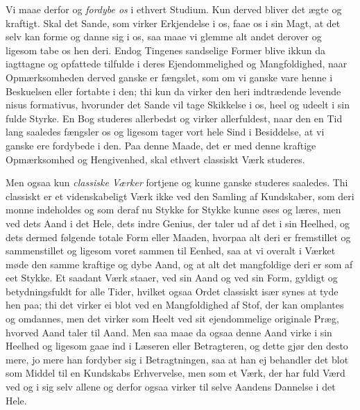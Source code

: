 \documentclass[12pt,a4paper]{book}
\newcommand{\apage}[1]{\marginnote{\footnotesize\textit{[#1]}}}
\begin{document}
Vi maae derfor og \emph{fordybe os} i ethvert Studium. Kun derved bliver det
ægte og kraftigt. Skal det Sande, som virker Erkjendelse i os, faae os i sin
Magt, at det selv kan forme og danne sig i os, saa maae vi glemme alt andet
derover og ligesom tabe os hen deri. Endog Tingenes sandselige Former blive
ikkun da iagttagne og opfattede tilfulde i deres Ejendommelighed og
Mangfoldighed, naar Opmærksomheden derved ganske er fængslet, som om vi ganske
vare henne i Beskuelsen eller fortabte i den; thi kun da virker den heri
indtrædende levende nisus formativus, hvorunder det Sande vil tage Skikkelse i
os, heel og udeelt i sin fulde Styrke. En Bog studeres allerbedst og virker
allerfuldest, naar den en Tid lang saaledes fængsler os og ligesom \apage{15}  tager vort
hele Sind i Besiddelse, at vi ganske ere fordybede i den. Paa denne Maade, det
er med denne kraftige Opmærksomhed og Hengivenhed, skal ethvert classiskt
Værk studeres.

Men ogsaa kun \emph{classiske Værker} fortjene og kunne ganske studeres
saaledes. Thi classiskt er et videnskabeligt Værk ikke ved den Samling af
Kundskaber, som deri monne indeholdes og som deraf nu Stykke for Stykke kunne
øses og læres, men ved dets Aand i det Hele, dets indre Genius, der taler ud af
det i sin Heelhed, og dets dermed følgende totale Form eller Maaden, hvorpaa alt
deri er fremstillet og sammenstillet og ligesom voret sammen til Eenhed, saa at
vi overalt i Værket møde den samme kraftige og dybe Aand, og at alt det
mangfoldige deri er som af eet Stykke. Et saadant Værk staaer, ved sin Aand og
ved sin Form, gyldigt og betydningsfuldt for alle Tider, hvilket ogsaa Ordet
classiskt især synes at tyde hen paa; thi det virker ei blot ved en Mangfoldighed
af Stof, der kan omplantes og omdannes, men det virker som Heelt ved sit
ejendommelige originale Præg, hvorved Aand taler til Aand. Men saa maae da ogsaa
denne Aand virke i sin Heelhed og ligesom gaae ind i Læseren eller Betragteren,
og dette gjør den desto mere, jo mere han fordyber sig i Betragtningen, saa at
han ej behandler det blot som Middel til en Kundskabs \apage{16}  Erhvervelse, men som et
Værk, der har fuld Værd ved og i sig selv allene og derfor ogsaa virker til
selve Aandens Dannelse i det Hele.
\end{document}
